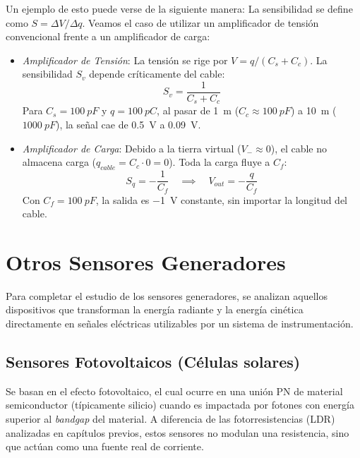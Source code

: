 Un ejemplo de esto puede verse de la siguiente manera: La sensibilidad se define como $S = \Delta V / \Delta q$. Veamos el caso de utilizar un amplificador de tensión convencional frente a un amplificador de carga:
    \begin{itemize}
        \item \emph{Amplificador de Tensión}: La tensión se rige por $V = q / (C_s + C_c)$. La sensibilidad $S_v$ depende críticamente del cable:
        \[ S_v = \frac{1}{C_s + C_c} \]
        Para $C_s = \qty{100}{pF}$ y $q = \qty{100}{pC}$, al pasar de \qty{1}{m} ($C_c \approx \qty{100}{pF}$) a \qty{10}{m} ($\qty{1000}{pF}$), la señal cae de \qty{0.5}{V} a \qty{0.09}{V}.
        \item \emph{Amplificador de Carga}: Debido a la tierra virtual ($V_- \approx 0$), el cable no almacena carga ($q_{cable} = C_c \cdot 0 = 0$). Toda la carga fluye a $C_f$:
        \[ S_q = -\frac{1}{C_f} \quad \implies \quad V_{out} = -\frac{q}{C_f} \]
        Con $C_f = \qty{100}{pF}$, la salida es \qty{-1}{V} constante, sin importar la longitud del cable.
    \end{itemize}



\section{Otros Sensores Generadores}\label{sec:otros_generadores}
Para completar el estudio de los sensores generadores, se analizan aquellos dispositivos que transforman la energía radiante y la energía cinética directamente en señales eléctricas utilizables por un sistema de instrumentación.

\subsection{Sensores Fotovoltaicos (Células solares)}
Se basan en el efecto fotovoltaico, el cual ocurre en una unión PN de material semiconductor (típicamente silicio) cuando es impactada por fotones con energía superior al \textit{bandgap} del material. A diferencia de las fotorresistencias (LDR) analizadas en capítulos previos, estos sensores no modulan una resistencia, sino que actúan como una fuente real de corriente.

